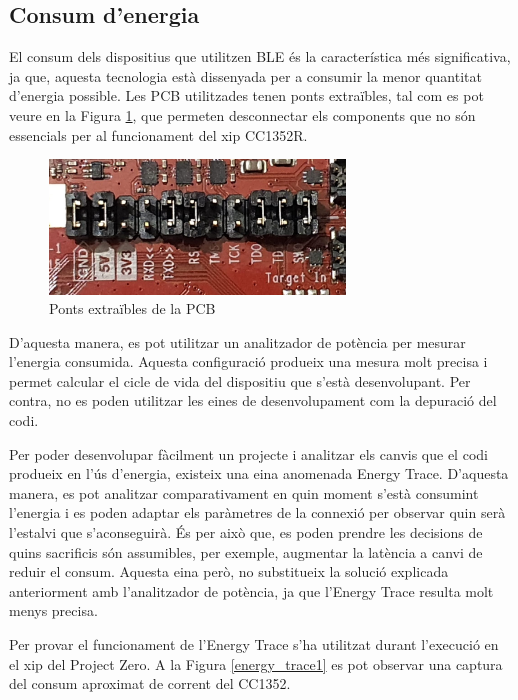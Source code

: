 \subsection{Consum d'energia}

El consum dels dispositius que utilitzen BLE és la característica més significativa, ja que, aquesta tecnologia està dissenyada per a consumir la menor quantitat d'energia possible.
Les PCB utilitzades tenen ponts extraïbles, tal com es pot veure en la Figura \ref{ponts_extraibles}, que permeten desconnectar els components que no són essencials per al funcionament del xip CC1352R.

\begin{figure}[h]
	\begin{center}
		\includegraphics[width=0.7\textwidth]{./images/ponts.jpg}
		\caption{Ponts extraïbles de la PCB}
		\label{ponts_extraibles}
	\end{center}
\end{figure}

D'aquesta manera, es pot utilitzar un analitzador de potència per mesurar l'energia consumida.
Aquesta configuració produeix una mesura molt precisa i permet calcular el cicle de vida del dispositiu que s'està desenvolupant.
Per contra, no es poden utilitzar les eines de desenvolupament com la depuració del codi.

Per poder desenvolupar fàcilment un projecte i analitzar els canvis que el codi produeix en l'ús d'energia, existeix una eina anomenada Energy Trace.
D'aquesta manera, es pot analitzar comparativament en quin moment s'està consumint l'energia i es poden adaptar els paràmetres de la connexió per observar quin serà l'estalvi que s'aconseguirà.
És per això que, es poden prendre les decisions de quins sacrificis són assumibles, per exemple, augmentar la latència a canvi de reduir el consum.
Aquesta eina però, no substitueix la solució explicada anteriorment amb l'analitzador de potència, ja que l'Energy Trace resulta molt menys precisa.

Per provar el funcionament de l'Energy Trace s'ha utilitzat durant l'execució en el xip del Project Zero.
A la Figura \ref{energy_trace1} es pot observar una captura del consum aproximat de corrent del CC1352.

